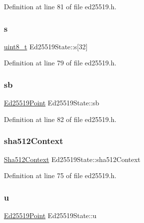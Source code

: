 Definition at line 81 of file ed25519.\+h.

\mbox{\label{structEd25519State_a6408b43f2f82c627e4bc602890d1859d}} 
\subsubsection{\texorpdfstring{s}{s}}
{\footnotesize\ttfamily \hyperlink{stdint_8h_aba7bc1797add20fe3efdf37ced1182c5}{uint8\+\_\+t} Ed25519\+State\+::s\mbox{[}32\mbox{]}}



Definition at line 79 of file ed25519.\+h.

\mbox{\label{structEd25519State_a3a304cf7e6cd67160cabfb98195b6226}} 
\subsubsection{\texorpdfstring{sb}{sb}}
{\footnotesize\ttfamily \hyperlink{structEd25519Point}{Ed25519\+Point} Ed25519\+State\+::sb}



Definition at line 82 of file ed25519.\+h.

\mbox{\label{structEd25519State_afdbdfe5a2f48317949f49d64892e30b1}} 
\subsubsection{\texorpdfstring{sha512\+Context}{sha512Context}}
{\footnotesize\ttfamily \hyperlink{structSha512Context}{Sha512\+Context} Ed25519\+State\+::sha512\+Context}



Definition at line 75 of file ed25519.\+h.

\mbox{\label{structEd25519State_a15570ce8099b0032ccd73a7e62a60803}} 
\subsubsection{\texorpdfstring{u}{u}}
{\footnotesize\ttfamily \hyperlink{structEd25519Point}{Ed25519\+Point} Ed25519\+State\+::u}



